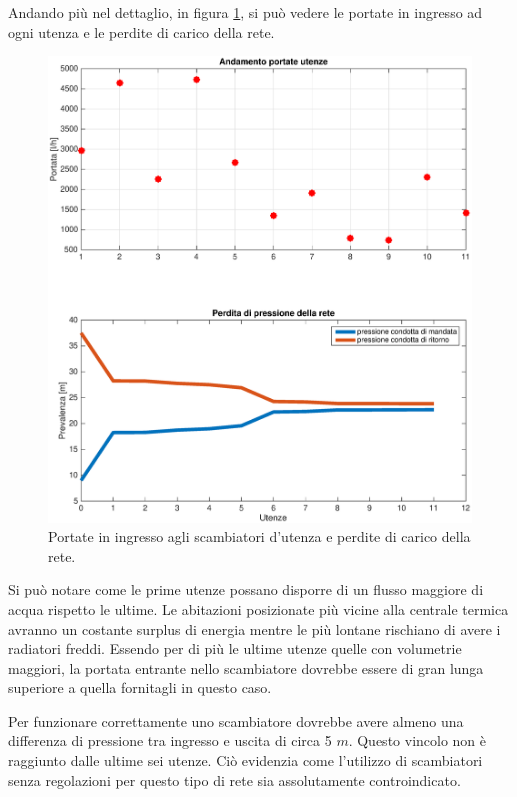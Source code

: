 \documentclass[laurea,oneside,11pt]{USiena_tesiLM}
\begin{document}
Andando più nel dettaglio, in figura \ref{fig:sim2_noreg}, si può vedere le portate in ingresso ad ogni utenza e le perdite di carico della rete. 

\begin{figure}[!ht]
\centering
\includegraphics[width=\textwidth]{figure/sim2_noreg} 
\caption{Portate in ingresso agli scambiatori d'utenza e perdite di carico della rete. }
\label{fig:sim2_noreg}
\end{figure}

Si può notare come le prime utenze possano disporre di un flusso maggiore di acqua rispetto le ultime. Le abitazioni posizionate più vicine alla centrale termica avranno un costante surplus di energia mentre le più lontane rischiano di avere i radiatori freddi. Essendo per di più le ultime utenze quelle con volumetrie maggiori, la portata entrante nello scambiatore dovrebbe essere di gran lunga superiore a quella fornitagli in questo caso. 

Per funzionare correttamente uno scambiatore dovrebbe avere almeno una differenza di pressione tra ingresso e uscita di circa 5 $m$. Questo vincolo non è raggiunto dalle ultime sei utenze. 
Ciò evidenzia come l'utilizzo di scambiatori senza regolazioni per questo tipo di rete sia assolutamente controindicato.
\end{document}
